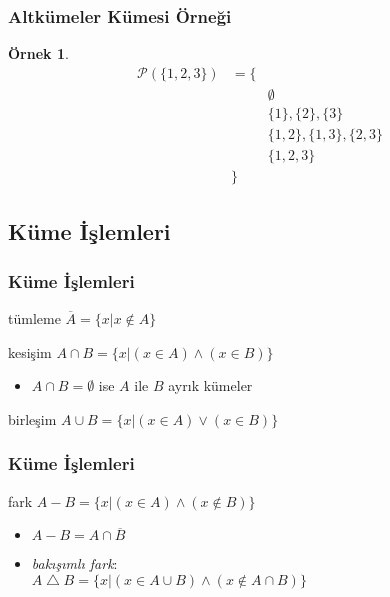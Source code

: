\documentclass[dvipsnames]{beamer}
\theoremstyle{definition}
\theoremstyle{example}
\newtheorem{ornek}[theorem]{Örnek}
\theoremstyle{plain}
\begin{document}
\begin{frame}
  \frametitle{Altkümeler Kümesi Örneği}

  \begin{ornek}
    \begin{eqnarray*}
      \mathcal{P}(\{1,2,3\}) & = \{ &\\
                             &      & \emptyset\\
                             &      & \{1\},\{2\},\{3\}\\
                             &      & \{1,2\},\{1,3\},\{2,3\}\\
                             &      & \{1,2,3\}\\
                             &   \} &
    \end{eqnarray*}
  \end{ornek}
\end{frame}

\subsection{Küme İşlemleri}

\begin{frame}
  \frametitle{Küme İşlemleri}

  \begin{block}{tümleme}
    $\overline{A} = \{ x | x \notin A \} $
  \end{block}

  \pause
  \begin{block}{kesişim}
    $A \cap B = \{ x | (x \in A) \wedge (x \in B) \}$

    \begin{itemize}
      \item $A \cap B = \emptyset$ ise $A$ ile $B$ \alert{ayrık kümeler}
    \end{itemize}
  \end{block}

  \pause
  \begin{block}{birleşim}
    $A \cup B = \{ x | (x \in A) \vee (x \in B) \}$
  \end{block}
\end{frame}

\begin{frame}
  \frametitle{Küme İşlemleri}

  \begin{block}{fark}
    $A - B = \{ x | (x \in A) \wedge (x \notin B) \}$

    \pause
    \begin{itemize}
      \item $A-B = A \cap \overline{B}$

      \pause
      \item \emph{bakışımlı fark}:\\
        $A \bigtriangleup B = \{ x | (x \in A \cup B)
                              \wedge (x \notin A \cap B) \}$
    \end{itemize}
  \end{block}
\end{frame}
\end{document}
